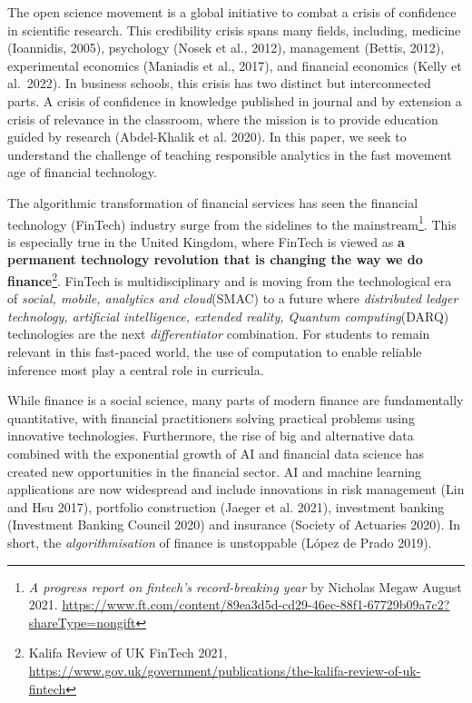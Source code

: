 \documentclass{article}
\begin{document}
The open science movement is a global initiative to combat a crisis of
confidence in scientific research. This credibility crisis spans many
fields, including, medicine (Ioannidis, 2005), psychology (Nosek et al.,
2012), management (Bettis, 2012), experimental economics (Maniadis et
al., 2017), and financial economics (Kelly et al.~2022). In business
schools, this crisis has two distinct but interconnected parts. A crisis
of confidence in knowledge published in journal and by extension a
crisis of relevance in the classroom, where the mission is to provide
education guided by research (Abdel-Khalik et al. 2020). In this paper,
we seek to understand the challenge of teaching responsible analytics in
the fast movement age of financial technology.

The algorithmic transformation of financial services has seen the
financial technology (FinTech) industry surge from the sidelines to the
mainstream\footnote{\emph{A progress report on fintech's record-breaking
  year} by Nicholas Megaw August 2021.
  \url{https://www.ft.com/content/89ea3d5d-cd29-46ec-88f1-67729b09a7c2?shareType=nongift}}.
This is especially true in the United Kingdom, where FinTech is viewed
as \textbf{a permanent technology revolution that is changing the way we
do finance}\footnote{Kalifa Review of UK FinTech 2021,
  \url{https://www.gov.uk/government/publications/the-kalifa-review-of-uk-fintech}}.
FinTech is multidisciplinary and is moving from the technological era of
\emph{social, mobile, analytics and cloud}(SMAC) to a future where
\emph{distributed ledger technology, artificial intelligence, extended
reality, Quantum computing}(DARQ) technologies are the next
\emph{differentiator} combination. For students to remain relevant in
this fast-paced world, the use of computation to enable reliable
inference most play a central role in curricula.

While finance is a social science, many parts of modern finance are
fundamentally quantitative, with financial practitioners solving
practical problems using innovative technologies. Furthermore, the rise
of big and alternative data combined with the exponential growth of AI
and financial data science has created new opportunities in the
financial sector. AI and machine learning applications are now
widespread and include innovations in risk management (Lin and Hsu
2017), portfolio construction (Jaeger et al. 2021), investment banking
(Investment Banking Council 2020) and insurance (Society of Actuaries
2020). In short, the \emph{algorithmisation} of finance is unstoppable
(López de Prado 2019).
\end{document}
